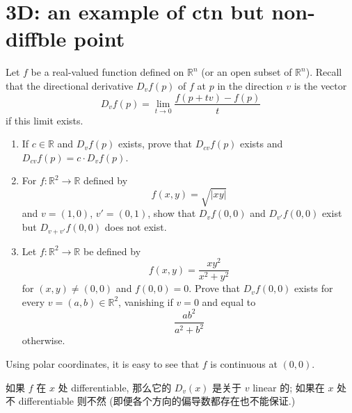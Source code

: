 \documentclass[lang=cn,11pt]{template}
\begin{document}
\section*{3D: an example of ctn but non-diffble point}
Let \( f \) be a real-valued function defined on \( \mathbb{R}^n \) (or an open subset of \( \mathbb{R}^n \)). Recall that the directional derivative \( D_v f(p) \) of \( f \) at \( p \) in the direction \( v \) is the vector
\[
D_v f(p) = \lim_{t \to 0} \frac{f(p + tv) - f(p)}{t}
\]
if this limit exists.
\begin{enumerate}
    \item If \( c \in \mathbb{R} \) and \( D_v f(p) \) exists, prove that \( D_{cv} f(p) \) exists and \( D_{cv} f(p) = c \cdot D_v f(p) \).
    \item For \( f : \mathbb{R}^2 \to \mathbb{R} \) defined by
    \[
    f(x, y) = \sqrt{|xy|}
    \]
    and \( v = (1, 0) \), \( v' = (0, 1) \), show that \( D_v f(0, 0) \) and \( D_{v'} f(0, 0) \) exist but \( D_{v+v'} f(0, 0) \) does not exist.
    \item Let \( f : \mathbb{R}^2 \to \mathbb{R} \) be defined by
    \[
    f(x, y) = \frac{xy^2}{x^2 + y^2}
    \]
    for \( (x, y) \neq (0, 0) \) and \( f(0, 0) = 0 \). Prove that \( D_v f(0, 0) \) exists for every \( v = (a, b) \in \mathbb{R}^2 \), vanishing if \( v = 0 \) and equal to
    \[
    \frac{ab^2}{a^2 + b^2}
    \]
    otherwise.
\end{enumerate}
Using polar coordinates, it is easy to see that \( f \) is continuous at \( (0, 0) \).

\begin{remark}
    如果 $f$ 在 $x$ 处 differentiable, 那么它的 $D_v(x)$ 是关于 $v$ linear 的; 如果在 $x$ 处 不 differentiable 则不然 (即便各个方向的偏导数都存在也不能保证.)
\end{remark}
\end{document}
